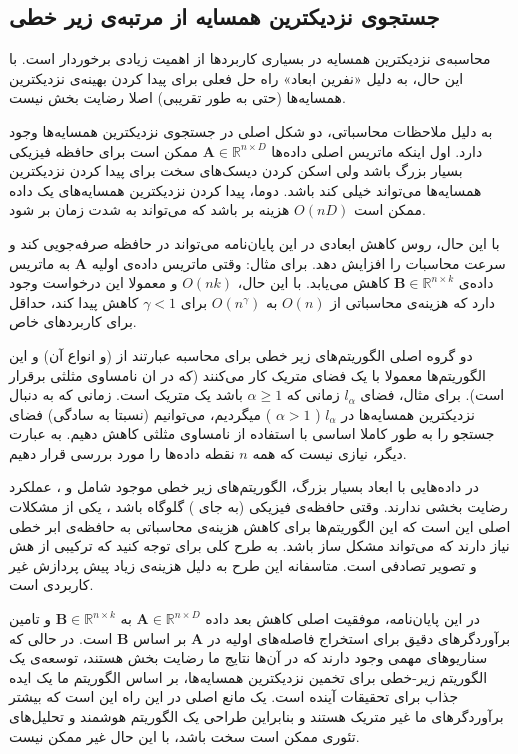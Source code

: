 \subsection{
جستجوی نزدیکترین همسایه از مرتبه‌ی زیر خطی
}
محاسبه‌ی نزدیکترین همسایه در بسیاری کاربردها از اهمیت زیادی برخوردار است. با این حال، به دلیل «نفرین ابعاد»
راه حل فعلی برای پیدا کردن بهینه‌ی نزدیکترین همسایه‌ها (حتی به طور تقریبی) اصلا رضایت بخش نیست.
\cite{litez88, litez100}

به دلیل ملاحظات محاسباتی، دو شکل اصلی در جستجوی نزدیکترین همسایه‌ها وجود دارد. اول اینکه ماتریس اصلی داده‌ها 
$\mathbf{A} \in \mathbb{R}^{n \times D}$
ممکن است برای حافظه فیزیکی بسیار بزرگ باشد ولی اسکن کردن دیسک‌های سخت برای پیدا کردن نزدیکترین همسایه‌ها می‌تواند خیلی کند باشد. دوما، پیدا کردن نزدیکترین همسایه‌های یک داده ممکن است
$O(nD)$
هزینه بر باشد که می‌تواند به شدت زمان بر شود.

با این حال، روس کاهش ابعادی در این پایان‌نامه می‌تواند در حافظه صرفه‌جویی کند و سرعت محاسبات را افزایش دهد. برای مثال: وقتی ماتریس داده‌ی اولیه 
$\mathbf{A}$
به ماتریس داده‌ی 
$\mathbf{B} \in \mathbb{R}^{n \times k}$
کاهش می‌یابد. با این حال، 
$O(nk)$
و معمولا این درخواست وجود دارد که هزینه‌ی محاسباتی از 
$O(n)$
به 
$O(n^\gamma)$
برای 
$\gamma < 1$
کاهش پیدا کند، حداقل برای کاربردهای خاص.

دو گروه اصلی الگوریتم‌های زیر خطی برای محاسبه عبارتند از 
(و انواع آن)
\cite{litez79, litez80}
و 
\cite{litez15, litez56, litez100}
این الگوریتم‌ها معمولا با یک فضای متریک کار می‌کنند (که در ان نامساوی مثلثی برقرار است). برای مثال، فضای 
$l_\alpha$
زمانی که 
$\alpha \geq 1$
باشد یک متریک است. زمانی که به دنبال نزدیکترین‌ همسایه‌ها در 
$l_\alpha$
(
$\alpha > 1$
) میگردیم، می‌توانیم (نسبتا به سادگی) فضای جستجو را به طور کاملا اساسی با استفاده از نامساوی مثلثی کاهش دهیم. به عبارت دیگر، نیازی نیست که همه 
$n$
نقطه داده‌ها را مورد بررسی قرار دهیم.

در داده‌هایی با ابعاد بسیار بزرگ، الگوریتم‌های زیر خطی موجود شامل 
و 
، عملکرد رضایت بخشی ندارند.  وقتی حافظه‌ی فیزیکی (به جای 
) گلوگاه باشد
، یکی از مشکلات اصلی این است که این الگوریتم‌ها برای کاهش هزینه‌ی محاسباتی به حافظه‌ی ابر خطی
 نیاز دارند که می‌تواند مشکل ساز باشد.
\cite{litez100}
به طرح کلی برای 
توجه کنید که ترکیبی از هش
و تصویر تصادفی است. متاسفانه این طرح به دلیل هزینه‌ی زیاد پیش پردازش غیر کاربردی است.
\cite{litez100}

در این پایان‌نامه، موفقیت اصلی کاهش بعد داده 
$\mathbf{A} \in \mathbb{R}^{n \times D}$
به
$\mathbf{B} \in \mathbb{R}^{n \times k}$
و تامین برآوردگرهای دقیق برای استخراج فاصله‌های اولیه در 
$\mathbf{A}$
بر اساس
$\mathbf{B}$
است. در حالی که سناریوهای مهمی وجود دارند که در آن‌ها نتایج ما رضایت بخش هستند، توسعه‌ی یک الگوریتم زیر-خطی برای تخمین نزدیکترین همسایه‌ها، بر اساس الگوریتم ما یک ایده جذاب برای تحقیقات آینده است. یک مانع اصلی در این راه این است که  بیشتر برآوردگرهای ما غیر متریک هستند و بنابراین طراحی یک الگوریتم هوشمند و تحلیل‌های تئوری ممکن است سخت باشد، با این حال غیر ممکن نیست.






